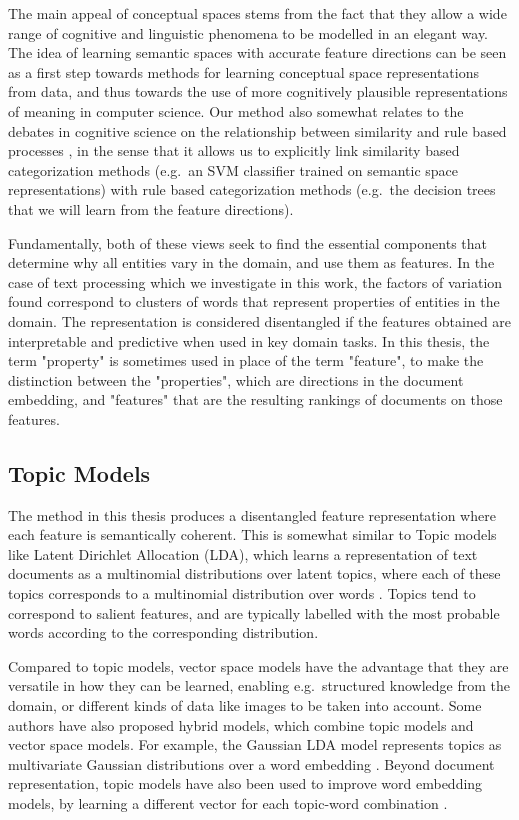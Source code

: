 The main appeal of conceptual spaces stems from the fact that they allow a wide range of cognitive and linguistic phenomena to be modelled in an elegant way. The idea of learning semantic spaces with accurate feature directions can be seen as a first step towards methods for learning conceptual space representations from data, and thus towards the use of more cognitively plausible representations of meaning in computer science. Our method also somewhat relates to the debates in cognitive science on the relationship between similarity and rule based processes  \cite{HAHN1998197}, in the sense that it allows us to explicitly link similarity based categorization methods (e.g.\ an SVM classifier trained on semantic space representations) with rule based categorization methods (e.g.\ the decision trees that we will learn from the feature directions).

Fundamentally, both of these views seek to find the essential components that determine why all entities vary in the domain, and use them as features. In the case of text processing which we investigate in this work, the factors of variation found correspond to clusters of words that represent properties of entities in the domain. The representation is considered disentangled if the features obtained are interpretable and  predictive when used in key domain tasks. In this thesis, the term "property" is sometimes used in place of the term "feature", to make the distinction between the "properties", which are directions in the document embedding, and "features"  that are the resulting rankings of documents on those features. 


\subsection{Topic Models}\label{bg:TopicModels}

The method in this thesis produces a disentangled feature representation where each feature is semantically coherent. This is somewhat similar to Topic models like Latent Dirichlet Allocation (LDA), which learns a representation of text documents as  a multinomial distributions over latent topics, where each of these topics corresponds to a multinomial distribution over words \cite{Blei03latentdirichlet}.  Topics tend to correspond to salient features, and are typically labelled with the most probable words according to the corresponding distribution. 

Compared to topic models, vector space models have the advantage that they are versatile in how they can be learned, enabling e.g.\ structured knowledge from the domain, or different kinds of data like images to be taken into account. Some authors have also proposed hybrid models, which combine topic models and vector space models. For example, the Gaussian LDA model represents topics as multivariate Gaussian distributions over a word embedding \cite{DBLP:conf/acl/DasZD15}. Beyond document representation, topic models have also been used to improve word embedding models, by learning a different vector for each topic-word combination \cite{DBLP:conf/aaai/LiuLCS15}.

